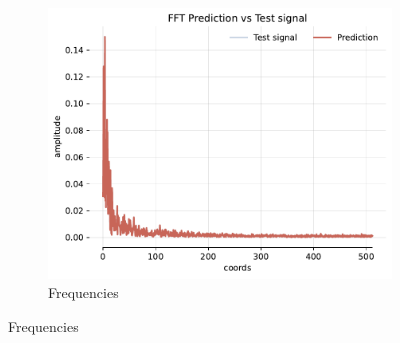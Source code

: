 \begin{figure}[h]
\begin{subfigure}[b]{0.32\textwidth}
        \centering
        \includegraphics[width=\textwidth]{img/ch3/fft-noise-hf4096-w512.pdf}
        \caption{Frequencies}
    \end{subfigure}


\end{figure}
